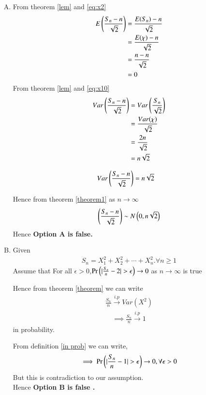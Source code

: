 \documentclass[journal,12pt,twocolumn]{IEEEtran}
\begin{document}
 \begin{enumerate}[(A)]
\item
From theorem \eqref{lem} and \eqref{eq:x2} 
\begin{align}
    E\left(\frac{S_{n}-n}{\sqrt{2}}\right)&=\frac{E(S_n)-n}{\sqrt{2}}\\
    &=\frac{E(\chi)-n}{\sqrt{2}}\\
    &=\frac{n-n}{\sqrt{2}}\\
    &=0
\end{align}
From theorem \eqref{lem} and \eqref{eq:x10}
\begin{align}
    Var\left(\frac{S_{n}-n}{\sqrt{2}}\right)&=Var\left(\frac{S_{n}}{\sqrt{2}}\right)\\
    &=\frac{Var(\chi)}{\sqrt{2}}\\
    &=\frac{2n}{\sqrt{2}}\\
    &=n\sqrt{2}
\end{align}


\begin{align}
    Var\left(\frac{S_{n}-n}{\sqrt{2}}\right)&= n\sqrt{2}   
\end{align}

Hence from theorem \ref{theorem1} as $n \to \infty$
\begin{align}
    \left(\frac{S_{n}-n}{\sqrt{2}}\right)\sim N\left(0,n\sqrt{2}\right)
\end{align}
Hence \textbf{Option A is false.}



\item Given 
\begin{align}
    S_{n}=X_{1}^2+X_{2}^2+\cdots+X_{n}^2.\forall n\geq 1
\end{align}
Assume that For all $\epsilon > 0$,$\Pr{\ensuremath{\left(\vert\frac{S_n}{n}-2\vert>\epsilon\right)}}\to 0$ as $n \to \infty$ is true

Hence from theorem \ref{theorem} we can write 
\begin{align}
    \frac{S_n}{n} \xrightarrow{i.p} Var(X^2)
\end{align}
\begin{align}
    \implies \frac{S_n}{n} \xrightarrow{i.p} 1
\end{align}
in probability.

From definition \ref{in prob} we can write,
\begin{align}
    \implies \Pr{\ensuremath{\left(\vert\frac{S_n}{n}-1\vert>\epsilon\right)}}\to 0,\forall \epsilon>0
\end{align}
But this is contradiction to our assumption.\\
Hence \textbf{Option B is false .}
 

\end{enumerate}
\end{document}

